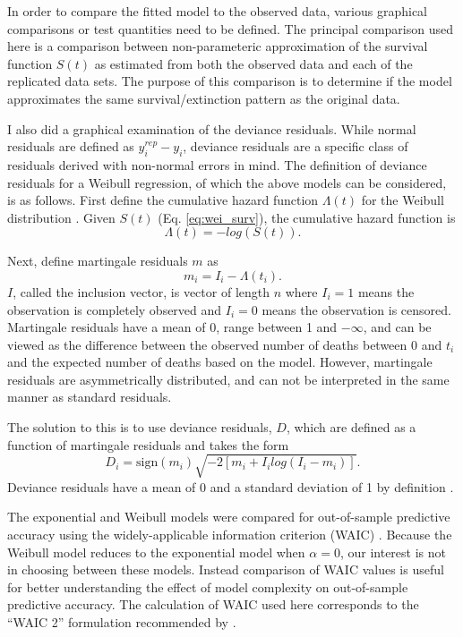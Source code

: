 \documentclass[12pt,letterpaper]{article}
\begin{document}
In order to compare the fitted model to the observed data, various graphical comparisons or test quantities need to be defined. The principal comparison used here is a comparison between non-parameteric approximation of the survival function \(S(t)\) as estimated from both the observed data and each of the replicated data sets. The purpose of this comparison is to determine if the model approximates the same survival/extinction pattern as the original data. 

I also did a graphical examination of the deviance residuals. While normal residuals are defined as \(y_{i}^{rep} - y_{i}\), deviance residuals are a specific class of residuals derived with non-normal errors in mind. The definition of deviance residuals for a Weibull regression, of which the above models can be considered, is as follows. First define the cumulative hazard function \(\Lambda(t)\) for the Weibull distribution \citep{Klein2003}. Given \(S(t)\) (Eq. \ref{eq:wei_surv}), the cumulative hazard function is 
\begin{equation}
  \Lambda(t) = -log\left(S\left(t\right)\right).
\end{equation}

Next, define martingale residuals \(m\) as
\begin{equation}
  m_{i} = I_{i} - \Lambda(t_i).
\end{equation}
\(I\), called the inclusion vector, is vector of length \(n\) where \(I_{i} = 1\) means the observation is completely observed and \(I_{i} = 0\) means the observation is censored. Martingale residuals have a mean of 0, range between 1 and \(-\infty\), and can be viewed as the difference between the observed number of deaths between 0 and \(t_{i}\) and the expected number of deaths based on the model. However, martingale residuals are asymmetrically distributed, and can not be interpreted in the same manner as standard residuals. 

The solution to this is to use deviance residuals, \(D\), which are defined as a function of martingale residuals and takes the form
\begin{equation}
  D_{i} = \text{sign}(m_{i}) \sqrt{-2[m_{i} + I_{i}log(I_{i} - m_{i})]}.
\end{equation}
Deviance residuals have a mean of 0 and a standard deviation of 1 by definition \citep{Klein2003}.

The exponential and Weibull models were compared for out-of-sample predictive accuracy using the widely-applicable information criterion (WAIC) \citep{Watanabe2010a}. Because the Weibull model reduces to the exponential model when \(\alpha = 0\), our interest is not in choosing between these models. Instead comparison of WAIC values is useful for better understanding the effect of model complexity on out-of-sample predictive accuracy. The calculation of WAIC used here corresponds to the ``WAIC 2'' formulation recommended by \citet{Gelman2013d}.
\end{document}
